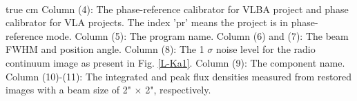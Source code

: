 \documentclass[]{aa} %
\begin{document}
\begin{table*}
\begin{center}
\begin{tabular}{c c c c l c c c c c c c}
      \hline
       \end{tabular}\\
    \end{center}
      true cm \noindent Column (4): The phase-reference calibrator for VLBA project and phase calibrator for VLA projects. The index 'pr' means the project is in phase-reference mode. Column (5): The program name. Column (6) and (7): The beam FWHM and position angle. Column (8): The 1 $\sigma$ noise level for the radio continuum image as present in Fig. \ref{L-Ka1}.  Column (9): The component name. Column (10)-(11): The integrated and peak flux densities measured from restored images with a beam size of 2" $\times$ 2", respectively.
    \end{table*}
\end{document}
